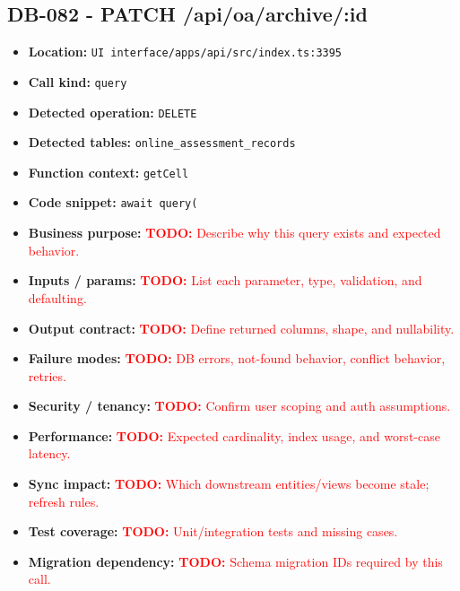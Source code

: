 \documentclass[11pt]{article}
\newcommand{\todoitem}[1]{\textcolor{red}{\textbf{TODO:} #1}}
\begin{document}
\subsection{DB-082 - PATCH /api/oa/archive/:id}
\begin{itemize}[leftmargin=1.5em]
\item \textbf{Location:} \texttt{UI interface/apps/api/src/index.ts:3395}
\item \textbf{Call kind:} \texttt{query}
\item \textbf{Detected operation:} \texttt{DELETE}
\item \textbf{Detected tables:} \texttt{online\_assessment\_records}
\item \textbf{Function context:} \texttt{getCell}
\item \textbf{Code snippet:} \texttt{await query(}
\item \textbf{Business purpose:} \todoitem{Describe why this query exists and expected behavior.}
\item \textbf{Inputs / params:} \todoitem{List each parameter, type, validation, and defaulting.}
\item \textbf{Output contract:} \todoitem{Define returned columns, shape, and nullability.}
\item \textbf{Failure modes:} \todoitem{DB errors, not-found behavior, conflict behavior, retries.}
\item \textbf{Security / tenancy:} \todoitem{Confirm user scoping and auth assumptions.}
\item \textbf{Performance:} \todoitem{Expected cardinality, index usage, and worst-case latency.}
\item \textbf{Sync impact:} \todoitem{Which downstream entities/views become stale; refresh rules.}
\item \textbf{Test coverage:} \todoitem{Unit/integration tests and missing cases.}
\item \textbf{Migration dependency:} \todoitem{Schema migration IDs required by this call.}
\end{itemize}
\end{document}
